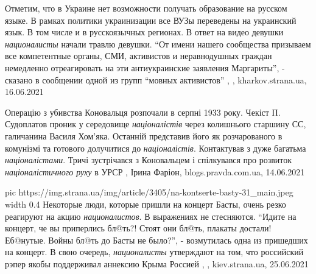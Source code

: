 Отметим, что в Украине нет возможности получать образование на русском языке. В
рамках политики украинизации все ВУЗы переведены на украинский язык. В том
числе и в русскоязычных регионах.  В ответ на видео девушки \emph{националисты} начали
травлю девушки.  \enquote{От имени нашего сообщества призываем все компетентные органы,
СМИ, активистов и неравнодушных граждан немедленно отреагировать на эти
антиукраинские заявления Маргариты}, - сказано в сообщении одной из групп
\enquote{мовных активистов}
, , kharkov.strana.ua, 16.06.2021

Операцію з убивства Коновальця розпочали в серпні 1933 року. Чекіст П.
Судоплатов проник у середовище \emph{націоналістів} через колишнього старшину СС,
галичанина Василя Хом'яка. Останній представив його як розчарованого в
комунізмі та готового долучитися до \emph{націоналістів}. Контактував з дуже багатьма
\emph{націоналістами}. Тричі зустрічався з Коновальцем і спілкувався про розвиток
\emph{націоналістичного руху} в УРСР
, 
Ірина Фаріон, blogs.pravda.com.ua, 14.06.2021


\ifcmt
  pic https://img.strana.ua/img/article/3405/na-kontserte-basty-31_main.jpeg
  width 0.4
\fi
Некоторые люди, которые пришли на концерт Басты, очень резко реагируют на акцию
\emph{националистов}. В выражениях не стесняются.  \enquote{Идите на концерт, че вы приперлись
бл@ть?! Стоят они бл@ть, плакаты достали! Еб@нутые. Войны бл@ть до Басты не
было?}, - возмутилась одна из пришедших на концерт.  В свою очередь,
\emph{националисты} утверждают на том, что российский рэпер якобы поддерживал аннексию
Крыма Россией
  , , kiev.strana.ua, 25.06.2021
